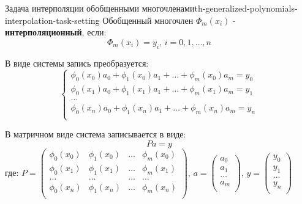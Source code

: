 \documentclass[14pt]{extarticle}
\begin{document}
    \begin{theorem}{Задача интерполяции обобщенными многочленами}{th-generalized-polynomials-interpolation-task-setting}
        Обобщенный многочлен $\Phi_{m}(x_{i})$ - \textbf{интерполяционный}, если:
        $$\Phi_{m}(x_{i}) = y_{i} \text{, } i = 0, 1, \ldots, n$$

        В виде системы запись преобразуется:
        $$
        \begin{cases}
            \phi_{0}(x_{0})a_{0} + \phi_{1}(x_{0})a_{1} + \ldots + \phi_{m}(x_{0})a_{m} = y_{0}\\
            \phi_{0}(x_{1})a_{0} + \phi_{1}(x_{1})a_{1} + \ldots + \phi_{m}(x_{1})a_{m} = y_{1}\\
            \ldots\\
            \phi_{0}(x_{n})a_{0} + \phi_{1}(x_{n})a_{1} + \ldots + \phi_{m}(x_{n})a_{m} = y_{n}\\
        \end{cases}
        $$

        В матричном виде система записывается в виде:
        $$Pa = y$$
        где:
        $
        P = \begin{pmatrix}
            \phi_{0}(x_{0}) & \phi_{1}(x_{0}) & \ldots & \phi_{m}(x_{0})\\
            \phi_{0}(x_{1}) & \phi_{1}(x_{1}) & \ldots & \phi_{m}(x_{1})\\
            \ldots & \ldots & \ldots & \ldots\\
            \phi_{0}(x_{n}) & \phi_{1}(x_{n}) & \ldots & \phi_{m}(x_{n})\\
        \end{pmatrix}
        $,
        $
        a = \begin{pmatrix}
            a_{0}\\
            a_{1}\\
            \ldots\\
            a_{m}\\
        \end{pmatrix}
        $,
        $
        y = \begin{pmatrix}
            y_{0}\\
            y_{1}\\
            \ldots\\
            y_{n}\\
        \end{pmatrix}
        $
    \end{theorem}
\end{document}
